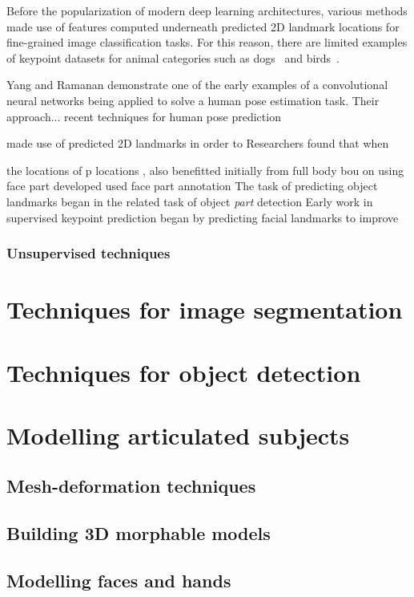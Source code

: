 Before the popularization of modern deep learning architectures, various methods made use of features computed underneath predicted 2D landmark locations for fine-grained image classification tasks. For this reason, there are limited examples of keypoint datasets for animal categories such as dogs~\cite{xxx} and birds~\cite{xxx}. 

Yang and Ramanan demonstrate one of the early examples of a convolutional neural networks being applied to solve a human pose estimation task. Their approach... recent techniques for human pose prediction 


made use of predicted 2D landmarks in order to Researchers found that when 

the locations of p locations , also benefitted initially from full body bou on using face part developed used face part annotation The task of predicting object landmarks began in the related task of object \emph{part} detection Early work in supervised keypoint prediction began by predicting facial landmarks to improve 

\subsubsection{Unsupervised techniques}


\section{Techniques for image segmentation}


\section{Techniques for object detection}


\section{Modelling articulated subjects}

\subsection{Mesh-deformation techniques}

\subsection{Building 3D morphable models}

\subsection{Modelling faces and hands}

